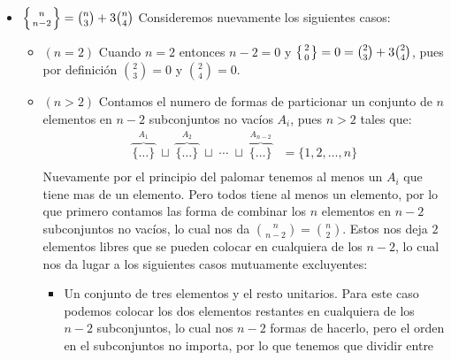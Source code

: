 \begin{solucion}
\begin{itemize}
        \item $\left\{n \atop n-2\right\} = \binom{n}{3} + 3\binom{n}{4}$
        Consideremos nuevamente los siguientes casos:
        \begin{itemize}
            \item $(n=2)$ Cuando $n=2$ entonces $n-2=0$ y $\left\{2 \atop 0\right\} = 0 = \binom{2}{3} + 3\binom{2}{4}$, pues por definición $\binom{2}{3} = 0$ y $\binom{2}{4} = 0$.    
            \item $(n>2)$ Contamos el numero de formas de particionar un conjunto de $n$ elementos en $n-2$ subconjuntos no vacíos $A_i$, pues $n>2$ tales que:
            \begin{align*}
                \overbrace{\{\dots\}}^{A_1} \;\sqcup\; \overbrace{\{\dots\}}^{A_2} 
                \;\sqcup\; \cdots \;\sqcup\; \overbrace{\{\dots\}}^{A_{n-2}} &= \{1,2,\dots,n\} \\
            \end{align*}
            Nuevamente por el principio del palomar tenemos al menos un $A_i$ que tiene mas de un elemento. Pero todos tiene al menos un elemento, por lo que primero contamos las forma de combinar los $n$ elementos en $n-2$ subconjuntos no vacíos, lo cual nos da $\binom{n}{n-2} = \binom{n}{2}$. Estos nos deja $2$ elementos libres que se pueden colocar en cualquiera de los $n-2$, lo cual nos da lugar a los siguientes casos mutuamente excluyentes:
            \begin{itemize}
                \item Un conjunto de tres elementos y el resto unitarios. 
                Para este caso podemos colocar los dos elementos restantes en cualquiera de los $n-2$ subconjuntos, lo cual nos $n-2$ formas de hacerlo, pero el orden en el subconjuntos no importa, por lo que tenemos que dividir entre 
            \end{itemize}
        \end{itemize}
       
    \end{itemize}
\end{solucion}
